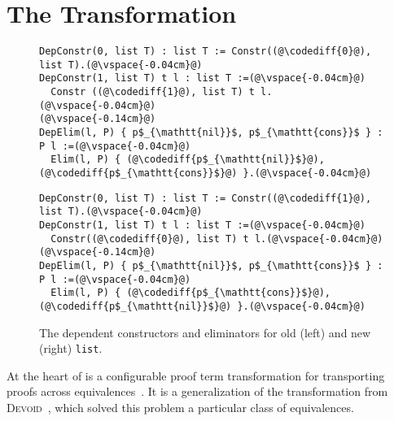 \section{The Transformation}
\label{sec:key2}

\begin{figure*}
\begin{minipage}{0.48\textwidth}
\begin{lstlisting}
DepConstr(0, list T) : list T := Constr((@\codediff{0}@), list T).(@\vspace{-0.04cm}@)
DepConstr(1, list T) t l : list T :=(@\vspace{-0.04cm}@)
  Constr ((@\codediff{1}@), list T) t l.(@\vspace{-0.04cm}@)
(@\vspace{-0.14cm}@)
DepElim(l, P) { p$_{\mathtt{nil}}$, p$_{\mathtt{cons}}$ } : P l :=(@\vspace{-0.04cm}@)
  Elim(l, P) { (@\codediff{p$_{\mathtt{nil}}$}@), (@\codediff{p$_{\mathtt{cons}}$}@) }.(@\vspace{-0.04cm}@)
\end{lstlisting}
\end{minipage}
\hfill
\begin{minipage}{0.48\textwidth}
\begin{lstlisting}
DepConstr(0, list T) : list T := Constr((@\codediff{1}@), list T).(@\vspace{-0.04cm}@)
DepConstr(1, list T) t l : list T :=(@\vspace{-0.04cm}@)
  Constr((@\codediff{0}@), list T) t l.(@\vspace{-0.04cm}@)
(@\vspace{-0.14cm}@)
DepElim(l, P) { p$_{\mathtt{nil}}$, p$_{\mathtt{cons}}$ } : P l :=(@\vspace{-0.04cm}@)
  Elim(l, P) { (@\codediff{p$_{\mathtt{cons}}$}@), (@\codediff{p$_{\mathtt{nil}}$}@) }.(@\vspace{-0.04cm}@)
\end{lstlisting}
\end{minipage}
\vspace{-0.3cm}
\caption{The dependent constructors and eliminators for old (left) and new (right) \lstinline{list}.}
\vspace{-0.1cm}
\label{fig:listconfig}
\end{figure*}

At the heart of \toolname is a configurable proof term transformation for transporting
proofs across equivalences~. %
It is a generalization of the transformation from 
\textsc{Devoid}~\cite{Ringer2019}, which solved this problem a particular class of equivalences.

